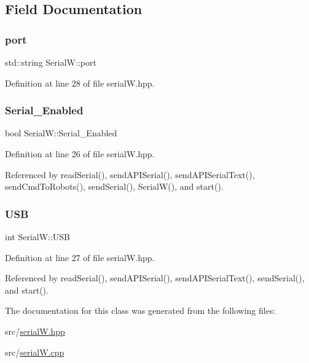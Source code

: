 \subsection{Field Documentation}
\mbox{\label{class_serial_w_afc325a02adcff1960a5be974a908631e}} 
\subsubsection{\texorpdfstring{port}{port}}
{\footnotesize\ttfamily std\+::string Serial\+W\+::port}



Definition at line 28 of file serial\+W.\+hpp.

\mbox{\label{class_serial_w_a557f72152ee772956c44fade26c1fd14}} 
\subsubsection{\texorpdfstring{Serial\+\_\+\+Enabled}{Serial\_Enabled}}
{\footnotesize\ttfamily bool Serial\+W\+::\+Serial\+\_\+\+Enabled}



Definition at line 26 of file serial\+W.\+hpp.



Referenced by read\+Serial(), send\+A\+P\+I\+Serial(), send\+A\+P\+I\+Serial\+Text(), send\+Cmd\+To\+Robots(), send\+Serial(), Serial\+W(), and start().

\mbox{\label{class_serial_w_addbc2cde514329294a30fd04da051ec8}} 
\subsubsection{\texorpdfstring{U\+SB}{USB}}
{\footnotesize\ttfamily int Serial\+W\+::\+U\+SB}



Definition at line 27 of file serial\+W.\+hpp.



Referenced by read\+Serial(), send\+A\+P\+I\+Serial(), send\+A\+P\+I\+Serial\+Text(), send\+Serial(), and start().



The documentation for this class was generated from the following files\+:\begin{DoxyCompactItemize}
\item 
src/\hyperlink{serial_w_8hpp}{serial\+W.\+hpp}\item 
src/\hyperlink{serial_w_8cpp}{serial\+W.\+cpp}\end{DoxyCompactItemize}
